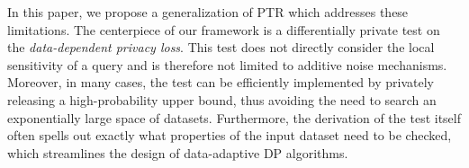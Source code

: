 
In this paper, we propose a generalization of PTR which addresses these limitations. The centerpiece of our framework is a differentially private test on the \emph{data-dependent privacy loss}.
This test does not directly consider the local sensitivity of a query and is therefore not limited to additive noise mechanisms. Moreover, in many cases, the test can be efficiently implemented by privately releasing a high-probability upper bound, thus avoiding the need to search an exponentially large space of datasets. Furthermore, the derivation of the test itself often spells out exactly what properties of the input dataset need to be checked, which streamlines the design of data-adaptive DP algorithms.



